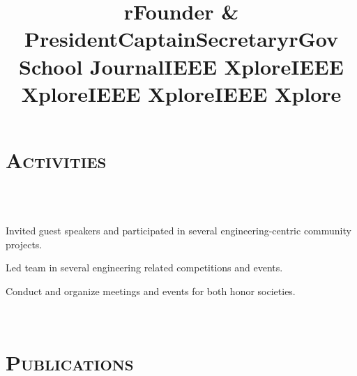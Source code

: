 \begin{resume}
\section{\textsc{Activities}}

\begin{formatb}
  \title{r}\\
  \body\\
\end{formatb}

\title{Founder \& President}
\begin{position}
Invited guest speakers and participated in several engineering-centric community projects.
\end{position}

\title{Captain}
\begin{position}
Led team in several engineering related competitions and events.
\end{position}

\title{Secretary}
\begin{position}
Conduct and organize meetings and events for both honor societies.
\end{position}

\begin{formatb}
  \title{r}\\
\end{formatb}

\section{\textsc{Publications}}

\title{Gov School Journal}
\begin{position}
\end{position}

\title{IEEE Xplore}
\begin{position}
\end{position}

\title{IEEE Xplore}
\begin{position}
\end{position}

\title{IEEE Xplore}
\begin{position}
\end{position}

\title{IEEE Xplore}
\begin{position}
\end{position}

\end{resume}

